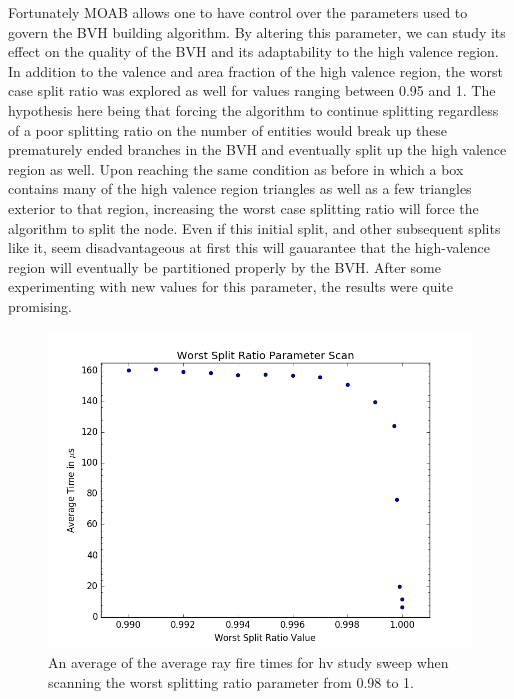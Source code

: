 \documentclass[12pt, a4paper]{article}
\begin{document}
  Fortunately MOAB allows one to have control over the parameters used to govern the BVH building algorithm. By altering this parameter, we can study its effect on the quality of the BVH and its adaptability to the high valence region. In addition to the valence and area fraction of the high valence region, the worst case split ratio was explored as well for values ranging between 0.95 and 1. The hypothesis here being that forcing the algorithm to continue splitting regardless of a poor splitting ratio on the number of entities would break up these prematurely ended branches in the BVH and eventually split up the high valence region as well. Upon reaching the same condition as before in which a box contains many of the high valence region triangles as well as a few triangles exterior to that region, increasing the worst case splitting ratio will force the algorithm to split the node. Even if this initial split, and other subsequent splits like it, seem disadvantageous at first this will gauarantee that the high-valence region will eventually be partitioned properly by the BVH. After some experimenting with new values for this parameter, the results were quite promising.

  \begin{figure}
    \centering
    \includegraphics[scale=0.55]{wsr_scan.png}
    \caption{An average of the average ray fire times for hv study sweep when scanning the worst splitting ratio parameter from 0.98 to 1.}
    \end{figure}
  
\end{document}
